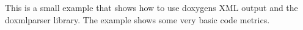This is a small example that shows how to use doxygen\textquotesingle{}s X\+ML output and the doxmlparser library. The example shows some very basic code metrics. 